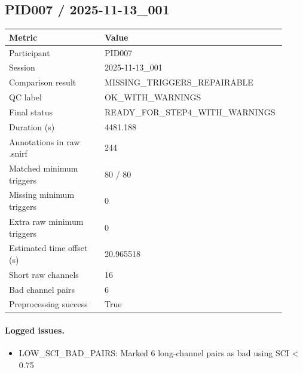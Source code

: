 \subsection*{PID007 / 2025-11-13\_001}
\begin{tabular}{p{0.34\linewidth}p{0.58\linewidth}}
\toprule
Metric & Value\\
\midrule
Participant & PID007\\
Session & 2025-11-13\_001\\
Comparison result & MISSING\_TRIGGERS\_REPAIRABLE\\
QC label & OK\_WITH\_WARNINGS\\
Final status & READY\_FOR\_STEP4\_WITH\_WARNINGS\\
Duration (s) & 4481.188\\
Annotations in raw .snirf & 244\\
Matched minimum triggers & 80 / 80\\
Missing minimum triggers & 0\\
Extra raw minimum triggers & 0\\
Estimated time offset (s) & 20.965518\\
Short raw channels & 16\\
Bad channel pairs & 6\\
Preprocessing success & True\\
\bottomrule
\end{tabular}
\paragraph{Logged issues.}
\begin{itemize}
\item [WARNING] LOW\_SCI\_BAD\_PAIRS: Marked 6 long-channel pairs as bad using SCI < 0.75
\end{itemize}
